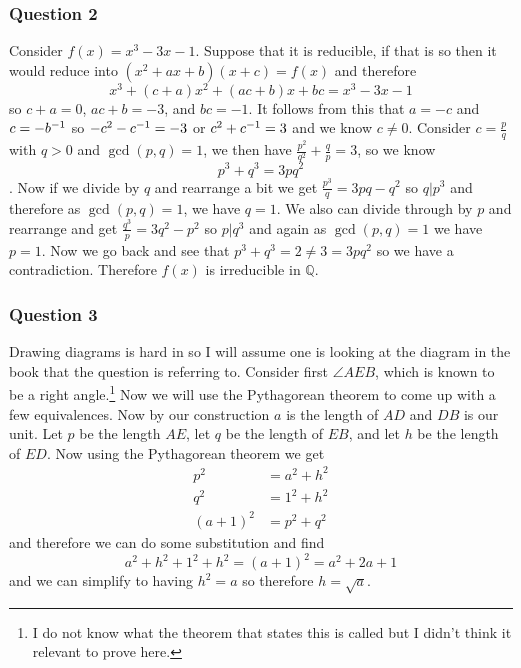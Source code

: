 \documentclass{article}
\begin{document}
\subsubsection{Question 2}
Consider $f(x) = x^3-3x-1$. Suppose that it is reducible, if that is so then it would reduce into $(x^2+ax+b)(x+c) = f(x)$ and therefore $$x^3+(c+a)x^2+(ac+b)x+bc=x^3-3x-1$$ so $c+a=0$, $ac+b=-3$, and $bc = -1$. It follows from this that $a=-c$ and $c=-{b}^{-1}$ so $-c^2-{c}^{-1} = -3$ or $c^2+{c}^{-1} = 3$ and we know $c\not=0$. Consider $c = \frac pq$ with $q > 0$ and $\gcd(p,q) = 1$, we then have $\frac{p^2}{q^2}+\frac qp = 3$, so we know $$p^3+q^3=3pq^2$$. Now if we divide by $q$ and rearrange a bit we get $\frac{p^3}q = 3pq-q^2$ so $q|p^3$ and therefore as $\gcd(p,q)=1$, we have $q=1$. We also can divide through by $p$ and rearrange and get $\frac{q^3}{p}=3q^2-p^2$ so $p|q^3$ and again as $\gcd(p,q) =  1$ we have $p=1$. Now we go back and see that $p^3+q^3=2\not=3=3pq^2$ so we have a contradiction. Therefore $f(x)$ is irreducible in $\mathbb Q$.

\subsubsection{Question 3}
Drawing diagrams is hard in \latex so I will assume one is looking at the diagram in the book that the question is referring to. Consider first $\angle AEB$, which is known to be a right angle.\footnote{I do not know what the theorem that states this is called but I didn't think it relevant to prove here.} Now we will use the Pythagorean theorem to come up with a few equivalences. Now by our construction $a$ is the length of $AD$ and $DB$ is our unit. Let $p$ be the length $AE$, let $q$ be the length of $EB$, and let $h$ be the length of $ED$. Now using the Pythagorean theorem we get
\begin{align*}
p^2 &= a^2 + h^2\\
q^2 &= 1^2 + h^2 \\
(a+1)^2&= p^2 + q^2
\end{align*}
and therefore we can do some substitution and find $$a^2+h^2+1^2+h^2=(a+1)^2=a^2+2a+1$$ and we can simplify to having $h^2=a$ so therefore $h=\sqrt a$.
\end{document}
